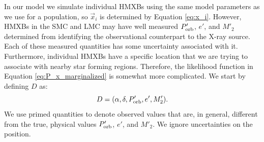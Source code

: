 \documentclass[12pt, preprint]{aastex}
\newcommand{\given}{\,|\,}
\begin{document}








In our model we simulate individual HMXBs using the same model parameters as we use for a population, so $\vec{x}_i$ is determined by Equation \ref{eq:x_i}. However, HMXBs in the SMC and LMC may have well measured $P'_{\rm orb}$, $e'$, and $M'_2$ determined from identifying the observational counterpart to the X-ray source. Each of these measured quantities has some uncertainty associated with it. Furthermore, individual HMXBs have a specific location that we are trying to associate with nearby star forming regions. Therefore, the likelihood function in Equation \ref{eq:P_x_marginalized} is somewhat more complicated. We start by defining $D$ as:
\begin{equation}
D = (\alpha, \delta, P'_{\rm orb}, e', M'_2). \label{eq:D}
\end{equation}
We use primed quantities to denote observed values that are, in general, different from the true, physical values $P'_{\rm orb}$, $e'$, and $M'_2$. We ignore uncertainties on the position.
\end{document}
